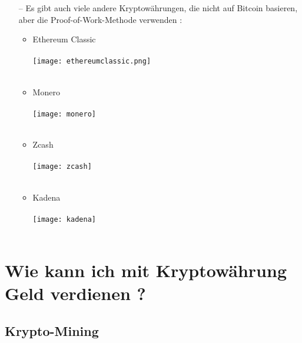 \documentclass[ngerman]{scrreprt}
\begin{document}
\begin{itemize}
	\item[--] Es gibt auch viele andere Kryptowährungen, die nicht auf Bitcoin basieren, aber die Proof-of-Work-Methode verwenden :
	\begin{itemize}
		\item{Ethereum Classic} \\ \\
		\texttt{[image: ethereumclassic.png]}\\ \\
		\item{Monero}\\ \\
		\texttt{[image: monero]}\\ \\
		\item{Zcash}\\ \\
		\texttt{[image: zcash]}\\ \\
		\item{Kadena}\\ \\
		\texttt{[image: kadena]}\\ \\
	\end{itemize}
\end{itemize}


\section{Wie kann ich mit Kryptowährung Geld verdienen ?}
\subsection{Krypto-Mining}
\end{document}
